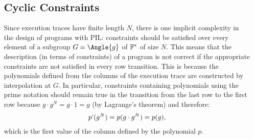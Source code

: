 %
%
%
%
%
%
%
%
%    







\subsection{Cyclic Constraints}

Since execution traces have finite length $N$, there is one implicit complexity in the design of programs with PIL: constraints should be satisfied over every element of a subgroup $G = \Angle{g}$ of $\mathbb{F}^*$ of size $N$. This means that the description (in terms of constraints) of a program is not correct if the appropriate constraints are not satisfied in every row transition. This is because the polynomials defined from the columns of the execution trace are constructed by interpolation at $G$. In particular, constraints containing polynomials using the prime notation should remain true in the transition from the last row to the first row because $g \cdot g^{N} = g \cdot 1 = g$ (by Lagrange's theorem) and therefore:
\[
p\textsf{'}(g^{N}) = p(g \cdot g^N) = p(g),
\]
which is the first value of the column defined by the polynomial $p$. 

